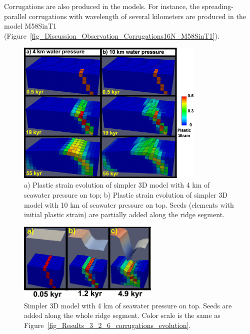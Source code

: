 Corrugations are also produced in the models. For instance, the spreading-parallel corrugations with wavelength of several kilometers are produced in the model M58SinT1 (Figure~\hyperref[fig_Discussion_Observation_Corrugations16N_M58SinT1]{\ref{fig_Discussion_Observation_Corrugations16N_M58SinT1}}).

\begin{figure}[h]
  \centering
    \includegraphics[width=0.8\textwidth]{./Figures/fig_Discussion_simple_models_for_corrugation_mechanism.eps}
  \caption[Simpler 3D models for formation mechanism of corrugation.]{a) Plastic strain evolution of simpler 3D model with 4 km of seawater pressure on top; b) Plastic strain evolution of simpler 3D model with 10 km of seawater pressure on top. Seeds (elements with initial plastic strain) are partially added along the ridge segment.}
 \label{fig_Discussion_simple_models_for_corrugation_mechanism}
\end{figure}

\begin{figure}[h]
  \centering
    \includegraphics[width=0.6\textwidth]{./Figures/fig_Discussion_Observation_6_Corrugation_simplerModel_4kwaterdepth_along_ridge_seed.eps}
  \caption[Simpler 3D model with 4 km of seawater pressure on top. Seeds are added along the whole ridge segment.]{Simpler 3D model with 4 km of seawater pressure on top. Seeds are added along the whole ridge segment. Color scale is the same as Figure~\hyperref[fig_Results_3_2_6_corrugations_evolution]{\ref{fig_Results_3_2_6_corrugations_evolution}}.}
 \label{fig_Discussion_Observation_6_Corrugation_simplerModel_4kwaterdepth_along_ridge_seed}
\end{figure}   

